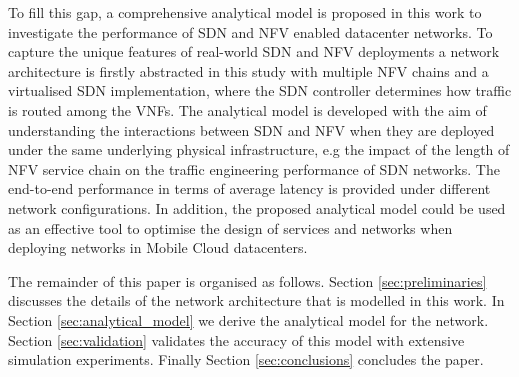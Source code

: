 To fill this gap, a comprehensive analytical model is proposed in this work to investigate the performance of SDN and NFV enabled datacenter networks. To capture the unique features of real-world SDN and NFV deployments a network architecture is firstly abstracted in this study with multiple NFV chains and a virtualised SDN implementation, where the SDN controller determines how traffic is routed among the VNFs. The analytical model is developed with the aim of understanding the interactions between SDN and NFV when they are deployed under the same underlying physical infrastructure, e.g the impact of the length of NFV service chain on the traffic engineering performance of SDN networks. The end-to-end performance in terms of average latency is provided under different network configurations. In addition, the proposed analytical model could be used as an effective tool to optimise the design of services and networks when deploying networks in Mobile Cloud datacenters.

The remainder of this paper is organised as follows. Section \ref{sec:preliminaries} discusses the details of the network architecture that is modelled in this work. In Section \ref{sec:analytical_model} we derive the analytical model for the network. Section \ref{sec:validation} validates the accuracy of this model with extensive simulation experiments. Finally Section \ref{sec:conclusions} concludes the paper.